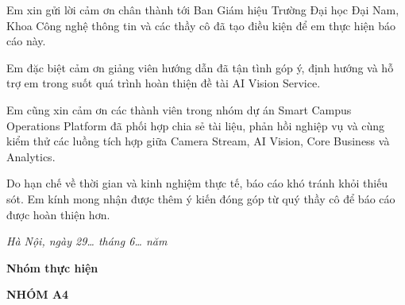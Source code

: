 
Em xin gửi lời cảm ơn chân thành tới Ban Giám hiệu Trường Đại học Đại Nam, Khoa Công nghệ thông tin và các thầy cô đã tạo điều kiện để em thực hiện báo cáo này.

Em đặc biệt cảm ơn giảng viên hướng dẫn \GiangVienHD{} đã tận tình góp ý, định hướng và hỗ trợ em trong suốt quá trình hoàn thiện đề tài AI Vision Service.

Em cũng xin cảm ơn các thành viên trong nhóm dự án Smart Campus Operations Platform đã phối hợp chia sẻ tài liệu, phản hồi nghiệp vụ và cùng kiểm thử các luồng tích hợp giữa Camera Stream, AI Vision, Core Business và Analytics.

Do hạn chế về thời gian và kinh nghiệm thực tế, báo cáo khó tránh khỏi thiếu sót. Em kính mong nhận được thêm ý kiến đóng góp từ quý thầy cô để báo cáo được hoàn thiện hơn.

\vspace{1cm}

\begin{flushright}
\begin{minipage}{8cm}
\centering
\textit{Hà Nội, ngày 29\ldots{} tháng 6\ldots{} năm \Nam}

\vspace{0.5cm}

\textbf{Nhóm thực hiện}

\vspace{2cm}

\textbf{NHÓM A4}
\end{minipage}
\end{flushright}

